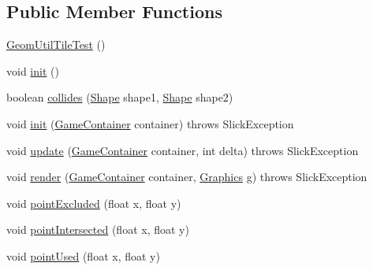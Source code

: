\subsection*{Public Member Functions}
\begin{DoxyCompactItemize}
\item 
\mbox{\hyperlink{classorg_1_1newdawn_1_1slick_1_1tests_1_1_geom_util_tile_test_a575c4c95de58e60fac79b507dceeae12}{Geom\+Util\+Tile\+Test}} ()
\item 
void \mbox{\hyperlink{classorg_1_1newdawn_1_1slick_1_1tests_1_1_geom_util_tile_test_adcd610185aaa46c043a85572ee6fb8fa}{init}} ()
\item 
boolean \mbox{\hyperlink{classorg_1_1newdawn_1_1slick_1_1tests_1_1_geom_util_tile_test_acc2015685ff9204e107a3bfff49459fb}{collides}} (\mbox{\hyperlink{classorg_1_1newdawn_1_1slick_1_1geom_1_1_shape}{Shape}} shape1, \mbox{\hyperlink{classorg_1_1newdawn_1_1slick_1_1geom_1_1_shape}{Shape}} shape2)
\item 
void \mbox{\hyperlink{classorg_1_1newdawn_1_1slick_1_1tests_1_1_geom_util_tile_test_a4023f00880afee2fe57863fca83e7bf2}{init}} (\mbox{\hyperlink{classorg_1_1newdawn_1_1slick_1_1_game_container}{Game\+Container}} container)  throws Slick\+Exception 
\item 
void \mbox{\hyperlink{classorg_1_1newdawn_1_1slick_1_1tests_1_1_geom_util_tile_test_aa902c49c5eb60fa5740409778fe9da41}{update}} (\mbox{\hyperlink{classorg_1_1newdawn_1_1slick_1_1_game_container}{Game\+Container}} container, int delta)  throws Slick\+Exception 
\item 
void \mbox{\hyperlink{classorg_1_1newdawn_1_1slick_1_1tests_1_1_geom_util_tile_test_a83cc5204d09adcfcc60278c6ebab33e7}{render}} (\mbox{\hyperlink{classorg_1_1newdawn_1_1slick_1_1_game_container}{Game\+Container}} container, \mbox{\hyperlink{classorg_1_1newdawn_1_1slick_1_1_graphics}{Graphics}} g)  throws Slick\+Exception 
\item 
void \mbox{\hyperlink{classorg_1_1newdawn_1_1slick_1_1tests_1_1_geom_util_tile_test_a64220cb1bcc1b44dccb00d04fbf77b26}{point\+Excluded}} (float x, float y)
\item 
void \mbox{\hyperlink{classorg_1_1newdawn_1_1slick_1_1tests_1_1_geom_util_tile_test_a05285204f69079e9aa77a552400f0c0a}{point\+Intersected}} (float x, float y)
\item 
void \mbox{\hyperlink{classorg_1_1newdawn_1_1slick_1_1tests_1_1_geom_util_tile_test_a2aa4aae6b4ebaa2062067311ad02d129}{point\+Used}} (float x, float y)
\end{DoxyCompactItemize}

